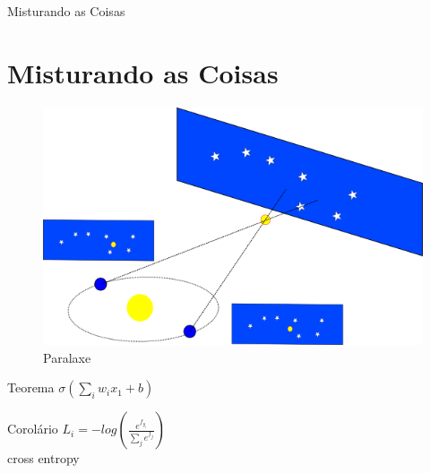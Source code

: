 \documentclass{beamer}
\begin{document}
\begin{frame}{Misturando as Coisas}
    \section{Misturando as Coisas}
    \begin{minipage}{0.58\textwidth}
        \begin{figure}
            \centering
            \includegraphics[scale=0.25]{ParallaxeV2.png}
            \caption{Paralaxe}
            \label{fig:my_label}
        \end{figure}
    \end{minipage}
    \hfill
    \begin{minipage}{0.36\textwidth}
        \begin{block}{Teorema}
        \centering
            $\sigma \left(\sum_i w_i x_1 + b \right)$
        \end{block}
        
        \begin{exampleblock}{Corolário}
            \centering
            $L_i = -log(\frac{e^{f_{y_i}}}{\sum_j e^{f_j}})$\\[0.1cm]
            cross entropy
        \end{exampleblock}
    \end{minipage}
\end{frame}
\end{document}
